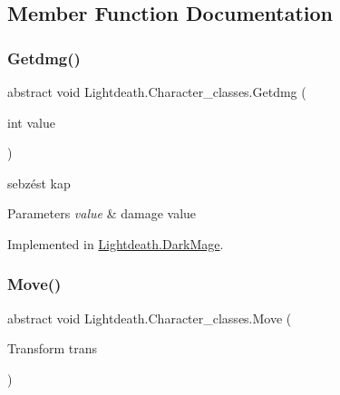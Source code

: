\subsection{Member Function Documentation}
\hypertarget{class_lightdeath_1_1_character__classes_a8aca5dd3f39cca87f55ccd333d0dc2ab}{}\label{class_lightdeath_1_1_character__classes_a8aca5dd3f39cca87f55ccd333d0dc2ab} 
\subsubsection{\texorpdfstring{Getdmg()}{Getdmg()}}
{\footnotesize\ttfamily abstract void Lightdeath.\+Character\+\_\+classes.\+Getdmg (\begin{DoxyParamCaption}\item[{int}]{value }\end{DoxyParamCaption})\hspace{0.3cm}{\ttfamily [pure virtual]}}



sebzést kap 


\begin{DoxyParams}{Parameters}
{\em value} & damage value\\
\hline
\end{DoxyParams}


Implemented in \hyperlink{class_lightdeath_1_1_dark_mage_a01e8b2ecfc7c649f384efe5b416507c1}{Lightdeath.\+Dark\+Mage}.

\hypertarget{class_lightdeath_1_1_character__classes_a9db6a2c0a9eaf35104b08fcad94f98d4}{}\label{class_lightdeath_1_1_character__classes_a9db6a2c0a9eaf35104b08fcad94f98d4} 
\subsubsection{\texorpdfstring{Move()}{Move()}}
{\footnotesize\ttfamily abstract void Lightdeath.\+Character\+\_\+classes.\+Move (\begin{DoxyParamCaption}\item[{Transform}]{trans }\end{DoxyParamCaption})\hspace{0.3cm}{\ttfamily [pure virtual]}}



